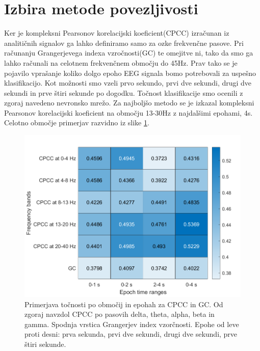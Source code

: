\section{Izbira metode povezljivosti}
Ker je kompleksni Pearsonov korelacijski koeficient(CPCC) izračunan iz analitičnih signalov ga lahko definiramo samo za ozke frekvenčne pasove. Pri računanju Grangerjevega indexa vzročnosti(GC) te omejitve ni, tako da smo ga lahko računali na celotnem frekvenčnem območju do 45Hz. Prav tako se je pojavilo vprašanje koliko dolgo epoho EEG signala bomo potrebovali za uspešno klasifikacijo. Kot možnosti smo vzeli prvo sekundo, prvi dve sekundi, drugi dve sekundi in prve štiri sekunde po dogodku. Točnost klasifikacije smo ocenili z zgoraj navedeno nevronsko mrežo. Za najboljšo metodo se je izkazal kompleksni Pearsonov korelacijski koeficient na območju 13-30Hz z najdalšimi epohami, 4s. Celotno območje primerjav razvidno iz slike \ref{slika:primerjava_obmocij}.
\begin{figure}
    \begin{center}
    \includegraphics[width=1\linewidth]{slike/Comparison.png}
    \end{center}
    \caption{Primerjava točnosti po območij in epohah za CPCC in GC. Od zgoraj navzdol CPCC po pasovih delta, theta, alpha, beta in gamma. Spodnja vrstica Grangerjev index vzorčnosti. Epohe od leve proti desni: prva sekunda, prvi dve sekundi, drugi dve sekundi, prve štiri sekunde.}
    \label{slika:primerjava_obmocij}
\end{figure}

\newpage
